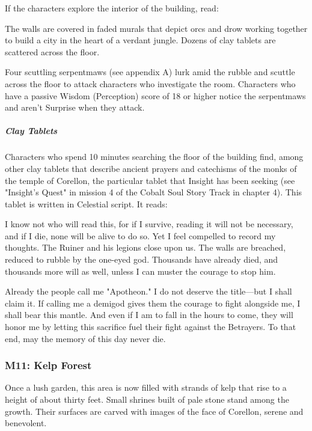 \documentclass[10pt,a4paper,twoside,bg=print,twocolumn,openany,nodeprecatedcode]{dndbook}
\begin{document}
If the characters explore the interior of the building, read:

\begin{DndReadAloud}{}
The walls are covered in faded murals that depict orcs and drow working together to build a city in the heart of a verdant jungle. Dozens of clay tablets are scattered across the floor.

\end{DndReadAloud}

Four scuttling serpentmaws (see appendix A) lurk amid the rubble and scuttle across the floor to attack characters who investigate the room. Characters who have a passive Wisdom (Perception) score of 18 or higher notice the serpentmaws and aren't Surprise when they attack.

\subparagraph{Clay Tablets}
Characters who spend 10 minutes searching the floor of the building find, among other clay tablets that describe ancient prayers and catechisms of the monks of the temple of Corellon, the particular tablet that Insight has been seeking (see "Insight's Quest" in mission 4 of the Cobalt Soul Story Track in chapter 4). This tablet is written in Celestial script. It reads:

\begin{DndReadAloud}{}
I know not who will read this, for if I survive, reading it will not be necessary, and if I die, none will be alive to do so. Yet I feel compelled to record my thoughts. The Ruiner and his legions close upon us. The walls are breached, reduced to rubble by the one-eyed god. Thousands have already died, and thousands more will as well, unless I can muster the courage to stop him.

Already the people call me "Apotheon." I do not deserve the title—but I shall claim it. If calling me a demigod gives them the courage to fight alongside me, I shall bear this mantle. And even if I am to fall in the hours to come, they will honor me by letting this sacrifice fuel their fight against the Betrayers. To that end, may the memory of this day never die.

\end{DndReadAloud}

\subsubsection{M11: Kelp Forest}
\begin{DndReadAloud}{}
Once a lush garden, this area is now filled with strands of kelp that rise to a height of about thirty feet. Small shrines built of pale stone stand among the growth. Their surfaces are carved with images of the face of Corellon, serene and benevolent.

\end{DndReadAloud}
\end{document}
